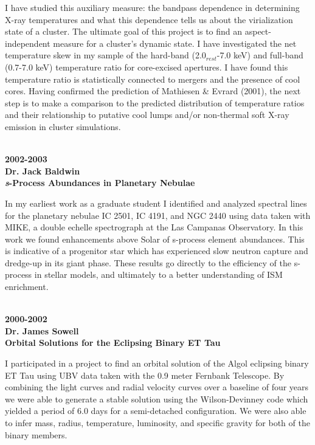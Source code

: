 \documentclass[12pt]{article}
\begin{document}
I have studied this auxiliary measure: the bandpass dependence in
determining X-ray temperatures and what this dependence tells us about
the virialization state of a cluster. The ultimate goal of this
project is to find an aspect-independent measure for a cluster's
dynamic state. I have investigated the net temperature skew in my
sample of the hard-band (2.0$_{rest}$-7.0 keV) and full-band (0.7-7.0
keV) temperature ratio for core-excised apertures. I have found this
temperature ratio is statistically connected to mergers and the
presence of cool cores. Having confirmed the prediction of
Mathiesen \& Evrard (2001), the next step is to make a comparison to
the predicted distribution of temperature ratios and their
relationship to putative cool lumps and/or non-thermal soft X-ray
emission in cluster simulations.

\begin{singlespace}
\\
{\bf{2002-2003}}\\
{\bf{Dr. Jack Baldwin}}\\
{\bf{{\textit{s}}-Process Abundances in Planetary Nebulae}}
\end{singlespace}
In my earliest work as a graduate student I identified and analyzed
spectral lines for the planetary nebulae IC 2501, IC 4191, and NGC
2440 using data taken with MIKE, a double echelle spectrograph at the
Las Campanas Observatory. In this work we found enhancements above
Solar of s-process element abundances. This is indicative of a
progenitor star which has experienced slow neutron capture and
dredge-up in its giant phase. These results go directly to the
efficiency of the s-process in stellar models, and ultimately to a
better understanding of ISM enrichment.

\begin{singlespace}
\\
{\bf{2000-2002}}\\
{\bf{Dr. James Sowell}}\\
{\bf{Orbital Solutions for the Eclipsing Binary ET Tau}}
\end{singlespace}
I participated in a project to find an orbital solution of the
Algol eclipsing binary ET Tau using UBV data taken with the 0.9 meter
Fernbank Telescope. By combining the light curves and radial velocity
curves over a baseline of four years we were able to generate a stable
solution using the Wilson-Devinney code which yielded a period of 6.0
days for a semi-detached configuration. We were also able to infer
mass, radius, temperature, luminosity, and specific gravity for both
of the binary members.
\end{document}
